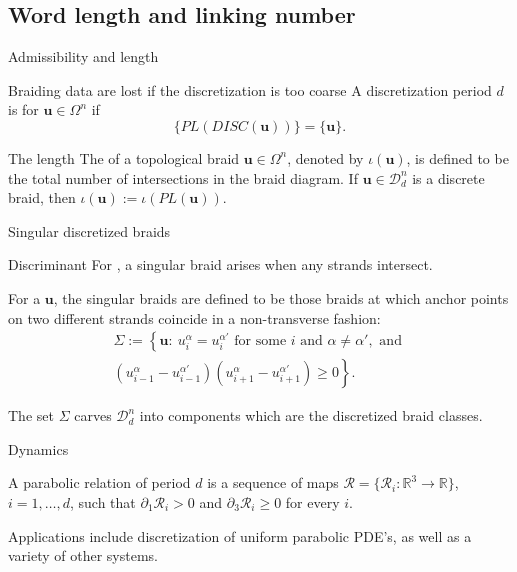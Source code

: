 \documentclass[9pt, english]{beamer}
\theoremstyle{definition}
\newcommand{\simbolovettore}[1]{{\boldsymbol{#1}}}
\newcommand{\vu}{\simbolovettore{u}}
\newcommand{\R}{\mathbb{R}}                     %
\begin{document}
\subsection{Word length and linking number}
\begin{frame}{Admissibility and length}\pause
    \begin{block}{Braiding data are lost if the discretization is too coarse}
            A discretization period $d$ is  for
            $\vu \in \Omega^n$ if
            \[
            \{PL(DISC(\vu))\}=\{\vu\}.
            \]
        \end{block}\pause
        \begin{block}{The length}
            The  of a topological braid $\vu\in \Omega^n$, denoted by
            $\iota(\vu)$, \pause is defined to be the \alert{total number of intersections
            in the braid diagram}. \pause If $\vu \in \mathcal{D}_d^n$ is  a
            discrete braid, then $\iota(\vu):=\iota(PL(\vu))$.
    \end{block}
\end{frame}
\begin{frame}{Singular discretized braids}
    \begin{block}{Discriminant}\pause
    For , a \alert{singular braid} arises
    when any strands intersect. \pause

For a 
    $\vu$, the \alert{singular braids} are defined to be those braids at
    which anchor points on two different strands coincide in a
    non-transverse fashion:\pause
    \begin{eqnarray*}
        \Sigma :=\left\{\vu: \ u_i^\alpha=u_i^{\alpha'} \text{ for some } i \text{ and } \alpha \neq \alpha',
        \textrm{ and }\right.\\
        \left.  (u_{i-1}^\alpha - u_{i-1}^{\alpha'})(u_{i+1}^\alpha- u_{i+1}^{\alpha'})\geq
        0\right\}.
        \end{eqnarray*}
    \end{block}\pause
    The set $\Sigma$ carves $\mathcal{D}_d^n$ into components which
    are the discretized braid classes.
\end{frame}
\begin{frame}{Dynamics}
    \begin{block}{A parabolic relation}
        of period $d$ is a sequence of maps $\mathcal{R}=\{\mathcal R_i:\R^3 \to
        \R\}$, $i=1, \dots, d$, such that $\partial_1 \mathcal R_i >0$ and
        $\partial_3 \mathcal R_i \geq 0$ for every $i$. \pause
        \end{block}
        \begin{block}{Applications}
        include discretization of uniform parabolic PDE's, as well
        as a variety of other systems.
        \end{block}
\end{frame}
\end{document}
